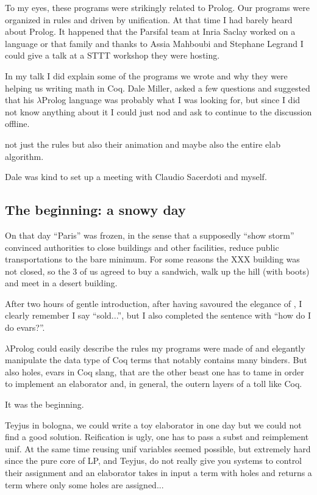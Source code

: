 \documentclass[a4paper, 11pt]{book}
\begin{document}
To my eyes, these programs were strikingly related to Prolog.
Our programs were organized in rules and driven by unification.
At that time I had barely heard about Prolog.
It happened that the Parsifal team
at Inria Saclay worked on a language or that family
and thanks to Assia Mahboubi and Stephane Legrand I could give a talk
at a STTT workshop they were hosting.

In my talk I did explain some of the programs we wrote and why they
were helping us writing math in Coq. Dale Miller, asked a few questions
and suggested that his $\lambda$Prolog language was probably what I
was looking for, but since I did not know anything about it I could
just nod and ask to continue to the discussion offline.

not just the rules but also their animation and maybe also the entire
elab algorithm.

Dale was kind
to set up a meeting with Claudio Sacerdoti and myself. 

\subsection{The beginning: a snowy day}

On that day ``Paris'' was frozen, in the sense that a supposedly
``show storm'' convinced authorities to close buildings and other facilities,
reduce public transportations to the bare minimum. For some reasons
the XXX building was not closed, so the 3 of us agreed to buy a sandwich,
walk up the hill (with boots) and meet in a desert building.

After two hours of gentle introduction, after having savoured the
elegance of , I clearly remember I say ``sold...'',
but I also completed the sentence with ``how do I do evars?''.

$\lambda$Prolog could easily describe the rules my programs were
made of and elegantly manipulate the data type of Coq terms that
notably contains many binders. But also holes, evars in Coq slang,
that are the other beast one has to tame in order to implement an
elaborator and, in general, the outern layers of a toll like Coq.

It was the beginning.

Teyjus in bologna, we could write a toy elaborator in one day
but we could not find a good solution. Reification is ugly, one has
to pass a subst and reimplement unif. At the same time reusing unif
variables seemed possible, but extremely hard since the pure core
of LP, and Teyjus, do not really give you systems to control their
assignment and an elaborator takes in input a term with holes
and returns a term where only some holes are assigned...
\end{document}
